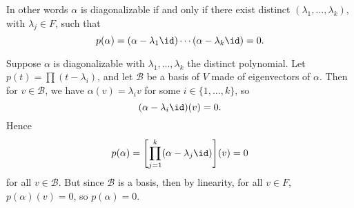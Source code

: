 \documentclass[12pt]{article}
\begin{document}
In other words $\alpha$ is diagonalizable if and only if there exist distinct $(\lambda_1, \ldots, \lambda_k)$, with $\lambda_j \in F$, such that
\[
	p(\alpha) = (\alpha - \lambda_1 \id) \cdots (\alpha - \lambda_k \id) = 0
.\]

\begin{proofbox}
	Suppose $\alpha$ is diagonalizable with $\lambda_1, \ldots, \lambda_k$ the distinct polynomial. Let $p(t) = \prod (t - \lambda_i)$, and let $\mathcal{B}$ be a basis of $V$ made of eigenvectors of $\alpha$. Then for $v \in \mathcal{B}$, we have $\alpha(v) = \lambda_i v$ for some $i \in \{1, \ldots, k\}$, so
	\[
		(\alpha - \lambda_i \id)(v) = 0
	.\]
	Hence
	\[
		p(\alpha) = \Biggl[ \prod_{j = 1}^{k} (\alpha - \lambda_j \id) \Biggr] (v) = 0
	\]
	for all $v \in \mathcal{B}$. But since $\mathcal{B}$ is a basis, then by linearity, for all $v \in F$, $p(\alpha)(v) = 0$, so $p(\alpha) = 0$.


\end{proofbox}
\end{document}
